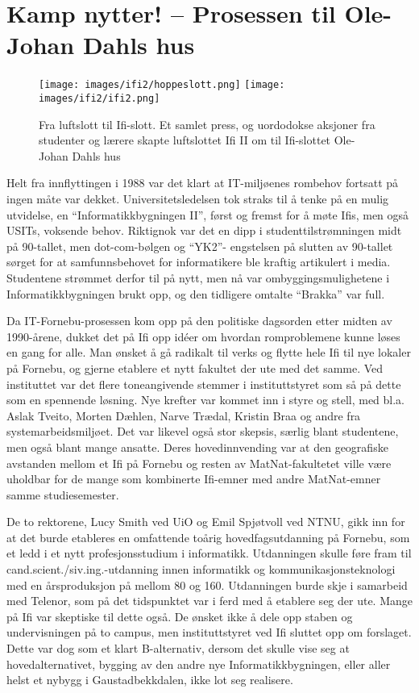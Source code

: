 \chapter[Ifi 2]{Kamp nytter! -- Prosessen til Ole-Johan Dahls hus}

\label{chap:ifi2}

\author{Skrevet av Narve Trædal}

\begin{figure}
	\texttt{[image: images/ifi2/hoppeslott.png]}
	\texttt{[image: images/ifi2/ifi2.png]}
	\caption{Fra luftslott til Ifi-slott. Et samlet press, og uordodokse aksjoner fra studenter og lærere skapte luftslottet Ifi II om til Ifi-slottet Ole-Johan Dahls hus}
\end{figure}

Helt fra innflyttingen i 1988 var det klart at IT-miljøenes rombehov fortsatt på ingen måte var dekket. Universitetsledelsen tok straks til å tenke på en mulig utvidelse, en ``Informatikkbygningen II'', først og fremst for å møte Ifis, men også USITs, voksende behov. Riktignok var det en dipp i studenttilstrømningen midt på 90-tallet, men dot-com-bølgen og ``YK2''- engstelsen på slutten av 90-tallet sørget for at samfunnsbehovet for informatikere ble kraftig artikulert i media. Studentene strømmet derfor til på nytt, men nå var ombyggingsmulighetene i Informatikkbygningen brukt opp, og den tidligere omtalte ``Brakka'' var full.

Da IT-Fornebu-prosessen kom opp på den politiske dagsorden etter midten av 1990-årene, dukket det på Ifi opp idéer om hvordan romproblemene kunne løses en gang for alle. Man ønsket å gå radikalt til verks og flytte hele Ifi til nye lokaler på Fornebu, og gjerne etablere et nytt fakultet der ute med det samme. Ved instituttet var det flere toneangivende stemmer i instituttstyret som så på dette som en spennende løsning. Nye krefter var kommet inn i styre og stell, med bl.a. Aslak Tveito, Morten Dæhlen, Narve Trædal, Kristin Braa og andre fra systemarbeidsmiljøet. Det var likevel også stor skepsis, særlig blant studentene, men også blant mange ansatte. Deres hovedinnvending var at den geografiske avstanden mellom et Ifi på Fornebu og resten av MatNat-fakultetet ville være uholdbar for de mange som kombinerte Ifi-emner med andre MatNat-emner samme studiesemester.

De to rektorene, Lucy Smith ved UiO og Emil Spjøtvoll ved NTNU, gikk inn for at det burde etableres en omfattende toårig hovedfagsutdanning på Fornebu, som et ledd i et nytt profesjonsstudium i informatikk. Utdanningen skulle føre fram til cand.scient.\slash siv.ing.-utdanning innen informatikk og
kommunikasjonsteknologi med en årsproduksjon på mellom 80 og 160. Utdanningen burde skje i samarbeid med Telenor, som på det tidspunktet var i ferd med å etablere seg der ute. Mange på Ifi var skeptiske til dette også. De ønsket ikke å dele opp staben og undervisningen på to campus, men instituttstyret ved Ifi sluttet opp om forslaget. Dette var dog som et klart B-alternativ, dersom det skulle vise seg at hovedalternativet, bygging av den andre nye Informatikkbygningen, eller aller helst et nybygg i Gaustadbekkdalen, ikke lot seg realisere.


